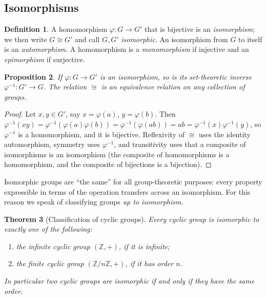 \documentclass[11pt,a4paper]{article}
\newtheorem{theorem}{Theorem}[section]
\newtheorem{proposition}[theorem]{Proposition}
\theoremstyle{definition}
\newtheorem{definition}[theorem]{Definition}
\theoremstyle{remark}
\newcommand{\Z}{\ensuremath{\mathbb{Z}}}
\begin{document}
\subsection{Isomorphisms}

\begin{definition}\label{groups:def-iso}
A homomorphism \(\varphi \colon G \to G'\) that is bijective is an \emph{isomorphism}; we then write \(G \cong G'\) and call \(G,G'\) \emph{isomorphic}. An isomorphism from \(G\) to itself is an \emph{automorphism}. A homomorphism is a \emph{monomorphism} if injective and an \emph{epimorphism} if surjective.
\end{definition}

\begin{proposition}\label{groups:prop-iso-inverse}
If \(\varphi\colon G \to G'\) is an isomorphism, so is its set-theoretic inverse \(\varphi^{-1}\colon G' \to G\). The relation \(\cong\) is an equivalence relation on any collection of groups.
\end{proposition}

\begin{proof}
Let \(x,y \in G'\), say \(x = \varphi(a)\), \(y = \varphi(b)\). Then \(\varphi^{-1}(xy) = \varphi^{-1}(\varphi(a)\varphi(b)) = \varphi^{-1}(\varphi(ab)) = ab = \varphi^{-1}(x)\varphi^{-1}(y)\), so \(\varphi^{-1}\) is a homomorphism, and it is bijective. Reflexivity of \(\cong\) uses the identity automorphism, symmetry uses \(\varphi^{-1}\), and transitivity uses that a composite of isomorphisms is an isomorphism (the composite of homomorphisms is a homomorphism, and the composite of bijections is a bijection).
\end{proof}

Isomorphic groups are ``the same'' for all group-theoretic purposes: every property expressible in terms of the operation transfers across an isomorphism. For this reason we speak of classifying groups \emph{up to isomorphism}.

\begin{theorem}[Classification of cyclic groups]\label{groups:thm-cyclic-classification}
Every cyclic group is isomorphic to exactly one of the following:
\begin{enumerate}
\item the infinite cyclic group \((\Z, +)\), if it is infinite;
\item the finite cyclic group \((\Z/n\Z, +)\), if it has order \(n\).
\end{enumerate}
In particular two cyclic groups are isomorphic if and only if they have the same order.
\end{theorem}
\end{document}
